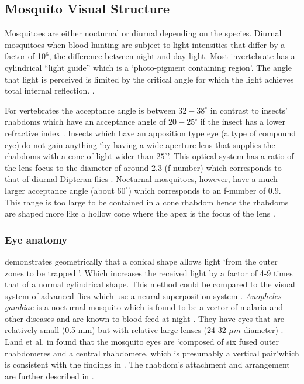 \subsection{Mosquito Visual Structure}
Mosquitoes are either nocturnal or diurnal depending on the species. Diurnal mosquitoes when blood-hunting are subject to light intensities that differ by a factor of 10$^6$, the difference between night and day light. Most invertebrate has a cylindrical ``light guide'' which is a \lq photo-pigment containing region\rq\cite{laughlin1975membranes}. The angle that light is perceived is limited by the critical angle for which the light achieves total internal reflection. \cite{land1997mosquito}. 

For vertebrates the acceptance angle is between $32-38^{\circ}$ \cite{sidman1957structure} in contrast to insects' rhabdoms which have an acceptance angle of $20-25^{\circ}$ if the insect has a lower refractive index \cite{nilsson1989intensity}. Insects which have an apposition type eye (a type of compound eye) do not gain anything \lq by having a wide aperture lens that supplies the rhabdoms with a cone of light wider than $25^{\circ}$\rq \cite{land1997mosquito}. This optical system has a ratio of the lens focus to the diameter of around 2.3 (f-number) which corresponds to that of diurnal Dipteran flies \cite{roebroek1990insect}. Nocturnal mosquitoes, however, have a much larger acceptance angle (about $60^{\circ}$) which corresponds to an f-number of 0.9. This range is too large to be contained in a cone rhabdom hence the rhabdoms are shaped more like a hollow cone where the apex is the focus of the lens \cite{mazokhin1978morphology}. 

\subsubsection{Eye anatomy}
\cite{land1997mosquito} demonstrates geometrically that a conical shape allows light \lq from the outer zones to be trapped \rq. Which increases the received light by a factor of 4-9 times that of a normal cylindrical shape. This method could be compared to the visual system of advanced flies which use a neural superposition system \cite{kirschfeld1967projection, ro1995pupil}. \textit{Anopheles gambiae} is a nocturnal mosquito which is found to be a vector of malaria and other diseases \cite{gillies1988anopheline, white1974anopheles} and are known to blood-feed at night \cite{clements1963physiology}. They have eyes that are relatively small (0.5 mm) but with relative large lenses (24-32 $\mu m$ diameter) \cite{sato1957studies, gray1953properties, mazokhin1978morphology, brammer1970ultrastructure}. Land et al. in \cite{land1997mosquito} found that the mosquito eyes are \lq composed  of six fused outer rhabdomeres and a central rhabdomere, which is presumably a vertical pair\rq which is consistent with the findings in \cite{melamed1975fine, hardie1985functional}. The rhabdom's attachment and arrangement are further described in \cite{land1997mosquito}. 

